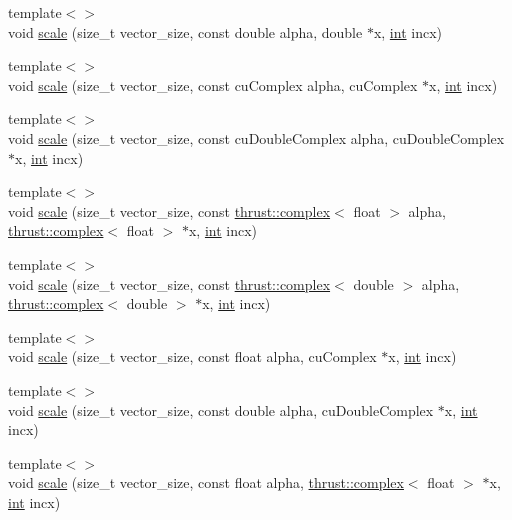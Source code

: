 \begin{DoxyCompactItemize}
{\footnotesize template$<$$>$ }\\void \hyperlink{classcublas__wrap_affc79465d81ad5fc5bb6989a1c9bf178}{scale} (size\-\_\-t vector\-\_\-size, const double alpha, double $\ast$x, \hyperlink{classint}{int} incx)
\item 
{\footnotesize template$<$$>$ }\\void \hyperlink{classcublas__wrap_a62992ff415c64fb371aaa9ed42666e64}{scale} (size\-\_\-t vector\-\_\-size, const cu\-Complex alpha, cu\-Complex $\ast$x, \hyperlink{classint}{int} incx)
\item 
{\footnotesize template$<$$>$ }\\void \hyperlink{classcublas__wrap_a240b78e1032ff27a07815bf138383e15}{scale} (size\-\_\-t vector\-\_\-size, const cu\-Double\-Complex alpha, cu\-Double\-Complex $\ast$x, \hyperlink{classint}{int} incx)
\item 
{\footnotesize template$<$$>$ }\\void \hyperlink{classcublas__wrap_a2f90549702df5b024c3b69ee7f16d179}{scale} (size\-\_\-t vector\-\_\-size, const \hyperlink{test__deflation__typedefs_8h_a25cabcac5deb559feab415e2c445d8ba}{thrust\-::complex}$<$ float $>$ alpha, \hyperlink{test__deflation__typedefs_8h_a25cabcac5deb559feab415e2c445d8ba}{thrust\-::complex}$<$ float $>$ $\ast$x, \hyperlink{classint}{int} incx)
\item 
{\footnotesize template$<$$>$ }\\void \hyperlink{classcublas__wrap_a5c5947b320701ce239ebd10a92eb3a7e}{scale} (size\-\_\-t vector\-\_\-size, const \hyperlink{test__deflation__typedefs_8h_a25cabcac5deb559feab415e2c445d8ba}{thrust\-::complex}$<$ double $>$ alpha, \hyperlink{test__deflation__typedefs_8h_a25cabcac5deb559feab415e2c445d8ba}{thrust\-::complex}$<$ double $>$ $\ast$x, \hyperlink{classint}{int} incx)
\item 
{\footnotesize template$<$$>$ }\\void \hyperlink{classcublas__wrap_a1807fd8e6dd5b2c82b7e2193f65fe223}{scale} (size\-\_\-t vector\-\_\-size, const float alpha, cu\-Complex $\ast$x, \hyperlink{classint}{int} incx)
\item 
{\footnotesize template$<$$>$ }\\void \hyperlink{classcublas__wrap_ae54836b3c3cc9a9270f1b964feae9aa5}{scale} (size\-\_\-t vector\-\_\-size, const double alpha, cu\-Double\-Complex $\ast$x, \hyperlink{classint}{int} incx)
\item 
{\footnotesize template$<$$>$ }\\void \hyperlink{classcublas__wrap_a614a1b5d2eb3671355c3ed0e3bcd16fd}{scale} (size\-\_\-t vector\-\_\-size, const float alpha, \hyperlink{test__deflation__typedefs_8h_a25cabcac5deb559feab415e2c445d8ba}{thrust\-::complex}$<$ float $>$ $\ast$x, \hyperlink{classint}{int} incx)

\end{DoxyCompactItemize}
